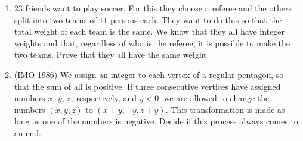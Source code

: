 \documentclass[11pt]{scrartcl}
\begin{document}
\begin{enumerate}
\item $23$ friends want to play soccer. For this they choose a referee and the others split into two teams of $11$ persons each. They want to do this so that the total weight of each team is the same. We know that they all have integer weights and that, regardless of who is the referee, it is possible to make the two teams. Prove that they all have the same weight.

\item (IMO 1986) We assign an integer to each vertex of a regular pentagon, so that the sum of all is positive. If three consecutive vertices have assigned numbers $x$, $y$, $z$, respectively, and $y < 0$, we are allowed to change the numbers $(x,y,z)$ to $(x + y,-y,z + y)$. This transformation is made as long as one of the numbers is negative. Decide if this process always comes to an end.


\end{enumerate}
\end{document}

